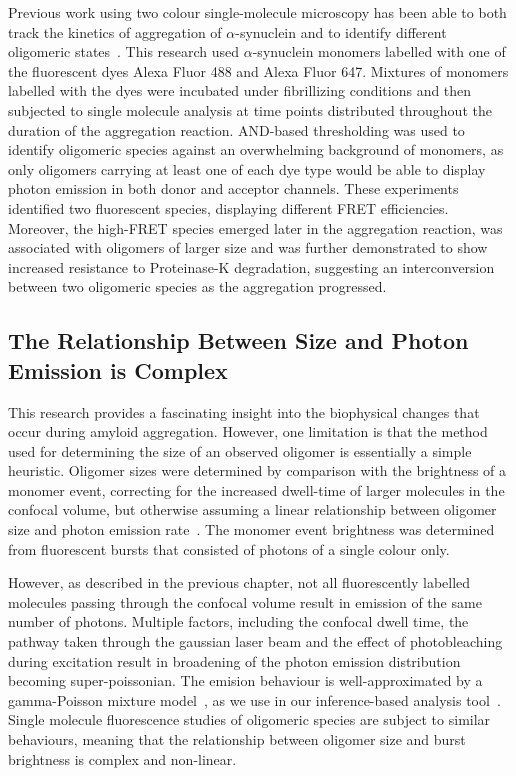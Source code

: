 Previous work using two colour single-molecule microscopy has been able to both track the kinetics of aggregation of $\alpha$-synuclein and to identify different oligomeric states~\cite{cremades2012}. This research used $\alpha$-synuclein monomers labelled with one of the fluorescent dyes Alexa Fluor 488 and Alexa Fluor 647. Mixtures of monomers labelled with the dyes were incubated under fibrillizing conditions and then subjected to single molecule analysis at time points distributed throughout the duration of the aggregation reaction. AND-based thresholding was used to identify oligomeric species against an overwhelming background of monomers, as only oligomers carrying at least one of each dye type would be able to display photon emission in both donor and acceptor channels. These experiments identified two fluorescent species, displaying different FRET efficiencies. Moreover, the high-FRET species emerged later in the aggregation reaction, was associated with oligomers of larger size and was further demonstrated to show increased resistance to Proteinase-K degradation, suggesting an interconversion between two oligomeric species as the aggregation progressed.

\subsection{The Relationship Between Size and Photon Emission is Complex}


This research provides a fascinating insight into the biophysical changes that occur during amyloid aggregation. However, one limitation is that the method used for determining the size of an observed oligomer is essentially a simple heuristic. Oligomer sizes were determined by comparison with the brightness of a monomer event, correcting for the increased dwell-time of larger molecules in the confocal volume, but otherwise assuming a linear relationship between oligomer size and photon emission rate~\cite{orte08}. The monomer event brightness was determined from fluorescent bursts that consisted of photons of a single colour only.

However, as described in the previous chapter, not all fluorescently labelled molecules passing through the confocal volume result in emission of the same number of photons. Multiple factors, including the confocal dwell time, the pathway taken through the gaussian laser beam and the effect of photobleaching during excitation result in broadening of the photon emission distribution becoming super-poissonian. The emision behaviour is well-approximated by a gamma-Poisson mixture model~\cite{chen1999}, as we use in our inference-based analysis tool~\cite{murphy14}. Single molecule fluorescence studies of oligomeric species are subject to similar behaviours, meaning that the relationship between oligomer size and burst brightness is complex and non-linear. 

